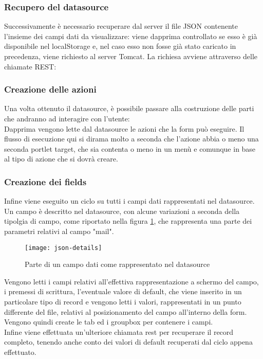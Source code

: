 \subsubsection{Recupero del datasource}
Successivamente è necessario recuperare dal server il file JSON contenente l'insieme dei campi dati da visualizzare: viene dapprima controllato se esso è già disponibile nel localStorage e, nel caso esso non fosse già stato caricato in precedenza, viene richiesto al server Tomcat.
La richiesa avviene attraverso delle chiamate REST: %
\subsubsection{Creazione delle azioni}
Una volta ottenuto il datasource, è possibile passare alla costruzione delle parti che andranno ad interagire con l'utente:\\
Dapprima vengono lette dal datasource le azioni che la form può eseguire. Il flusso di esecuzione qui si dirama molto a seconda che l'azione abbia o meno una seconda portlet target, che sia contenta o meno in un menù e comunque in base al tipo di azione che si dovrà creare.\\
\subsubsection{Creazione dei fields}
Infine viene eseguito un ciclo su tutti i campi dati rappresentati nel datasource. Un campo è descritto nel datasource, con alcune variazioni a seconda della tipolgia di campo, come riportato nella figura \ref{fig:json-detail}, che rappresenta una parte dei parametri relativi al campo "mail".\\  
	\begin{figure}[h]
		\centering
		\texttt{[image: json-details]}
		\caption{Parte di un campo dati come rappresentato nel datasource}
		\label{fig:json-detail}
	\end{figure}
Vengono letti i campi relativi all'effettiva rappresentazione a schermo del campo, i premessi di scrittura, l'eventuale valore di default, che viene inserito in un particolare tipo di \gls{record} e vengono letti i valori, rappresentati in un punto differente del file, relativi al posizionamento del campo all'interno della form.\\
Vengono quindi create le tab ed i groupbox per contenere i campi.\\
Infine viene effettuata un'ulteriore chiamata rest per recuperare il record completo, tenendo anche conto dei valori di default recuperati dal ciclo appena effettuato.